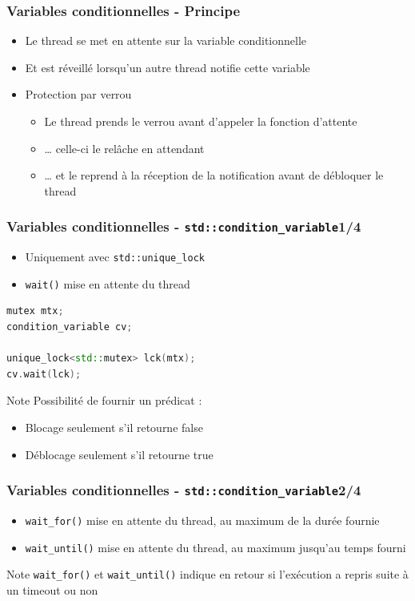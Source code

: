 \documentclass[C++.tex]{subfiles}
\begin{document}
\begin{frame}[fragile]
	\frametitle{Variables conditionnelles - Principe}
	\begin{itemize}
		\item Le thread se met en attente sur la variable conditionnelle
		\item Et est réveillé lorsqu'un autre thread notifie cette variable
		\item Protection par verrou
		\begin{itemize}
			\item Le thread prends le verrou avant d'appeler la fonction d'attente
			\item \ldots{} celle-ci le relâche en attendant
			\item \ldots{} et le reprend à la réception de la notification avant de débloquer le thread
		\end{itemize}
	\end{itemize}
\end{frame}

\begin{frame}[fragile]
	\frametitle{Variables conditionnelles - \lstinline|std::condition_variable|\titlehfill{}1/4}
	\begin{itemize}
		\item Uniquement avec \lstinline|std::unique_lock|
		\item \lstinline|wait()| mise en attente du thread
	\end{itemize}

	\begin{lstlisting}[language=C++]
mutex mtx;
condition_variable cv;

unique_lock<std::mutex> lck(mtx);
cv.wait(lck);\end{lstlisting}

	\begin{block}{Note}
		Possibilité de fournir un prédicat :
		\begin{itemize}
			\item Blocage seulement s'il retourne false
			\item Déblocage seulement s'il retourne true
		\end{itemize}
	\end{block}
\end{frame}

\begin{frame}[fragile]
	\frametitle{Variables conditionnelles - \lstinline|std::condition_variable|\titlehfill{}2/4}
	\begin{itemize}
		\item \lstinline|wait_for()| mise en attente du thread, au maximum de la durée fournie
		\item \lstinline|wait_until()| mise en attente du thread, au maximum jusqu'au temps fourni
	\end{itemize}

	\begin{block}{Note}
		\lstinline|wait_for()| et \lstinline|wait_until()| indique en retour si l'exécution a repris suite à un timeout ou non
	\end{block}
\end{frame}
\end{document}
